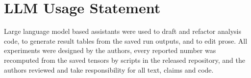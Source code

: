\section*{LLM Usage Statement}
Large language model based assistants were used to draft and refactor analysis code, to generate result tables from the saved run outputs, and to edit prose.
All experiments were designed by the authors, every reported number was recomputed from the saved tensors by scripts in the released repository, and the authors reviewed and take responsibility for all text, claims and code.
